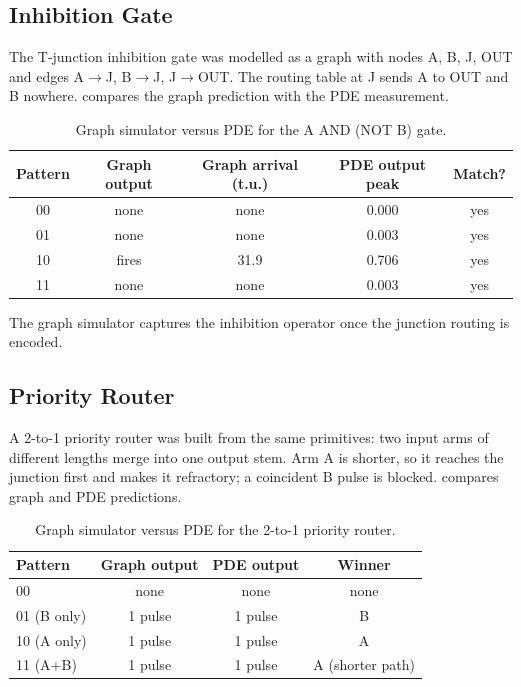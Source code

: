 \subsection{Inhibition Gate}
\label{sec:res_graph_andnot}

The T-junction inhibition gate was modelled as a graph with nodes A, B, J, OUT and edges A$\rightarrow$J, B$\rightarrow$J, J$\rightarrow$OUT.
The routing table at J sends A to OUT and B nowhere.
 compares the graph prediction with the PDE measurement.

\begin{table}[htbp]
\centering
\caption{Graph simulator versus PDE for the A AND (NOT B) gate.}
\label{tab:res_graph_andnot}
\small
\begin{tabular}{ccccc}
\toprule
Pattern & Graph output & Graph arrival (t.u.) & PDE output peak & Match? \\
\midrule
00 & none & none & 0.000 & yes \\
01 & none & none & 0.003 & yes \\
10 & fires & 31.9 & 0.706 & yes \\
11 & none & none & 0.003 & yes \\
\bottomrule
\end{tabular}
\end{table}

The graph simulator captures the inhibition operator once the junction routing is encoded.

\subsection{Priority Router}
\label{sec:res_graph_router}

A 2-to-1 priority router was built from the same primitives: two input arms of different lengths merge into one output stem.
Arm A is shorter, so it reaches the junction first and makes it refractory; a coincident B pulse is blocked.
 compares graph and PDE predictions.

\begin{table}[htbp]
\centering
\caption{Graph simulator versus PDE for the 2-to-1 priority router.}
\label{tab:res_graph_router}
\small
\begin{tabular}{lccc}
\toprule
Pattern & Graph output & PDE output & Winner \\
\midrule
00 & none & none & none \\
01 (B only) & 1 pulse & 1 pulse & B \\
10 (A only) & 1 pulse & 1 pulse & A \\
11 (A+B) & 1 pulse & 1 pulse & A (shorter path) \\
\bottomrule
\end{tabular}
\end{table}

